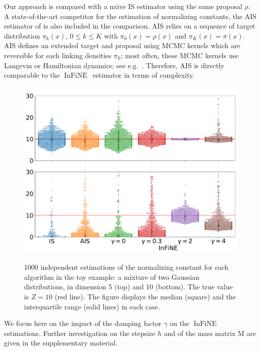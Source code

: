 \documentclass{article}
\def\mass{\mathrm{M}}
\def\IFIS{\ensuremath{\operatorname{InFiNE}}}
\def\eg{\text{e.g.}}
\newcommand{\1}{\mathds{1}}
\def\eg{e.g.}
\def\target{\pi}
\def\proposal{\rho}
\begin{document}
Our approach is compared with a na{\"\i}ve IS estimator using the same proposal $\rho$. 
A state-of-the-art competitor for the estimation of normalizing constants, the AIS estimator of \cite{neal:2001,tokdar2010importance} is also included in the comparison.
AIS relies on a sequence of target distribution $\target_k(x)$, $0 \leq k \leq K$ with $\target_0(x)= \proposal(x)$ and $\target_K(x)= \target(x)$. AIS defines an extended target and proposal using MCMC kernels which are reversible for each linking densities $\target_k$; most often, these MCMC kernels use Langevin or Hamiltonian dynamics; see \eg\ \cite{buchholz2021adaptive}. Therefore, AIS is directly comparable to the \IFIS\ estimator in terms of complexity.
\begin{figure}[!ht]
    \centering
    \includegraphics[width= \linewidth]{boxplot_two_gaussian_dim_5.pdf}
    \includegraphics[width= \linewidth]{boxplot_two_gaussian_dim_10.pdf}
    \caption{1000 independent estimations of the normalizing constant for each algorithm in the toy example:  a mixture of two Gaussian distributions, in dimension 5 (top) and 10 (bottom). The true value is $Z=10$ (red line). The figure displays the median (square) and the interquartile range (solid lines) in each case.}
    \label{fig:simple_gauss}
\end{figure}
We focus here on the impact of the damping factor $\gamma$ on the $\IFIS$ estimations. Further investigation on the stepsize $h$ and of the mass matrix $\mass$  are given in the supplementary material.
\end{document}
